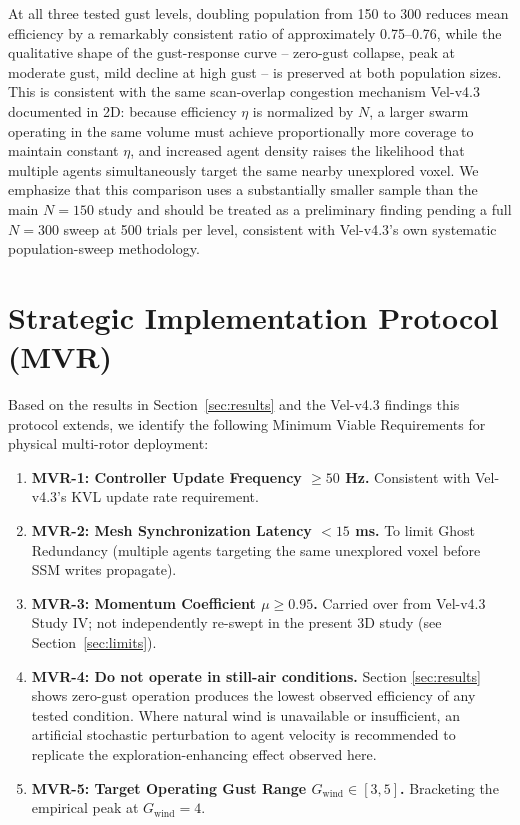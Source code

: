 \documentclass[10pt,journal]{IEEEtran}
\begin{document}
At all three tested gust levels, doubling population from 150 to 300
reduces mean efficiency by a remarkably consistent ratio of approximately
0.75--0.76, while the qualitative shape of the gust-response curve --
zero-gust collapse, peak at moderate gust, mild decline at high gust --
is preserved at both population sizes. This is consistent with the same
scan-overlap congestion mechanism Vel-v4.3 documented in 2D: because
efficiency $\eta$ is normalized by $N$, a larger swarm operating in the
same volume must achieve proportionally more coverage to maintain
constant $\eta$, and increased agent density raises the likelihood that
multiple agents simultaneously target the same nearby unexplored voxel.
We emphasize that this comparison uses a substantially smaller sample
than the main $N=150$ study and should be treated as a preliminary
finding pending a full $N=300$ sweep at 500 trials per level, consistent
with Vel-v4.3's own systematic population-sweep methodology.

\section{Strategic Implementation Protocol (MVR)}
\label{sec:mvr}

Based on the results in Section~\ref{sec:results} and the Vel-v4.3
findings this protocol extends, we identify the following Minimum Viable
Requirements for physical multi-rotor deployment:

\begin{enumerate}
\item \textbf{MVR-1: Controller Update Frequency $\geq 50$ Hz.} Consistent
with Vel-v4.3's KVL update rate requirement.
\item \textbf{MVR-2: Mesh Synchronization Latency $< 15$ ms.} To limit
Ghost Redundancy (multiple agents targeting the same unexplored voxel
before SSM writes propagate).
\item \textbf{MVR-3: Momentum Coefficient $\mu \geq 0.95$.} Carried over
from Vel-v4.3 Study IV; not independently re-swept in the present 3D study
(see Section~\ref{sec:limits}).
\item \textbf{MVR-4: Do not operate in still-air conditions.} Section
\ref{sec:results} shows zero-gust operation produces the lowest observed
efficiency of any tested condition. Where natural wind is unavailable or
insufficient, an artificial stochastic perturbation to agent velocity is
recommended to replicate the exploration-enhancing effect observed here.
\item \textbf{MVR-5: Target Operating Gust Range $G_{\text{wind}} \in
[3,5]$.} Bracketing the empirical peak at $G_{\text{wind}}=4$.
\end{enumerate}
\end{document}
